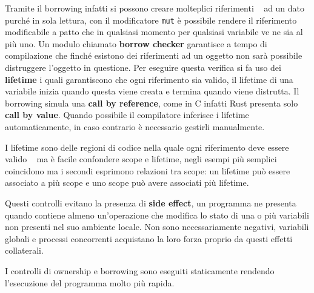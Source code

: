 \documentclass[Lau,binding=0.6cm]{sapthesis}
\newcommand{\textcode}[1]{\colorbox{backcolour}{\texttt{#1}}}
\begin{document}
Tramite il borrowing infatti si possono creare molteplici  riferimenti ~\cite[4.2]{rust:language} ad un dato purché in sola lettura, con il modificatore \textcode{mut} è possibile rendere il riferimento modificabile a patto che in qualsiasi momento per qualsiasi variabile ve ne sia al più uno. 
Un modulo chiamato \textbf{borrow checker} garantisce a tempo di compilazione che finché esistono dei riferimenti ad un oggetto non sarà possibile distruggere l'oggetto in questione.
Per eseguire questa verifica si fa uso dei \textbf{lifetime} i quali garantiscono che ogni riferimento sia valido, il lifetime di una variabile inizia quando questa viene creata e termina quando viene distrutta.
Il borrowing simula una \textbf{call by reference}, come in C infatti Rust presenta solo \textbf{call by value}.
Quando possibile il compilatore inferisce i lifetime automaticamente, in caso contrario è necessario gestirli manualmente.

I lifetime sono delle regioni di codice nella quale ogni riferimento deve essere valido ~\cite[3.3]{rust:rustonomicon} ma è facile confondere scope e lifetime, negli esempi più semplici coincidono ma i secondi esprimono relazioni tra scope: un lifetime può essere associato a più scope e uno scope può avere associati più lifetime. 



Questi controlli evitano la presenza di \textbf{side effect}, un programma ne presenta quando contiene almeno un'operazione che modifica lo stato di una o più variabili non presenti nel suo ambiente locale. 
Non sono necessariamente negativi, variabili globali e processi concorrenti acquistano la loro forza proprio da questi effetti collaterali.

I controlli di ownership e borrowing sono eseguiti staticamente rendendo l'esecuzione del programma molto più rapida.
\end{document}
